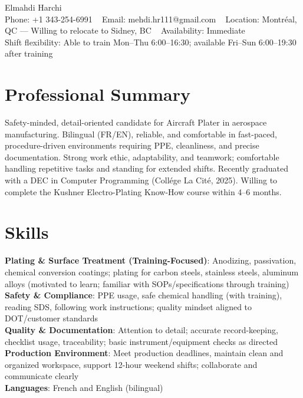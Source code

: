 \documentclass[letterpaper,11pt]{article}
\begin{document}
\begin{center}
    {\Large Elmahdi Harchi} \\[2mm]
    \footnotesize
    Phone: +1 343-254-6991 ~ 
    Email: mehdi.hr111@gmail.com ~ 
    Location: Montréal, QC — Willing to relocate to Sidney, BC ~ Availability: Immediate
    \\[1mm]
    Shift flexibility: Able to train Mon–Thu 6:00–16:30; available Fri–Sun 6:00–19:30 after training
    \vspace{-8pt}
\end{center}

\section{Professional Summary}
\vspace{1pt}
Safety-minded, detail-oriented candidate for Aircraft Plater in aerospace manufacturing. Bilingual (FR/EN), reliable, and comfortable in fast-paced, procedure-driven environments requiring PPE, cleanliness, and precise documentation. Strong work ethic, adaptability, and teamwork; comfortable handling repetitive tasks and standing for extended shifts. Recently graduated with a DEC in Computer Programming (Coll\'ege La Cit\'e, 2025). Willing to complete the Kushner Electro-Plating Know-How course within 4--6 months.
\vspace{-12pt}

\section{Skills}
\begin{itemize}[leftmargin=0.15in, label={}]
  \small{\item{
    \textbf{Plating \& Surface Treatment (Training-Focused)}{: Anodizing, passivation, chemical conversion coatings; plating for carbon steels, stainless steels, aluminum alloys (motivated to learn; familiar with SOPs/specifications through training)} \\[0.5mm]
    \textbf{Safety \& Compliance}{: PPE usage, safe chemical handling (with training), reading SDS, following work instructions; quality mindset aligned to DOT/customer standards} \\[0.5mm]
    \textbf{Quality \& Documentation}{: Attention to detail; accurate record-keeping, checklist usage, traceability; basic instrument/equipment checks as directed} \\[0.5mm]
    \textbf{Production Environment}{: Meet production deadlines, maintain clean and organized workspace, support 12-hour weekend shifts; collaborate and communicate clearly} \\[0.5mm]
    \textbf{Languages}{: French and English (bilingual)} \\[0.5mm]
  }}
\end{itemize}
\vspace{-16pt}
\end{document}
